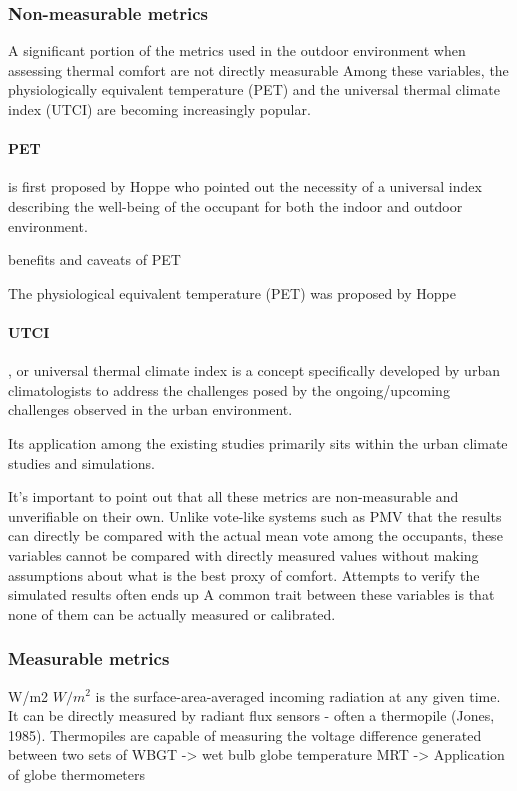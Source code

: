
\subsubsection{Non-measurable metrics}
    A significant portion of the metrics used in the outdoor environment when assessing thermal comfort are not directly measurable
    Among these variables, the physiologically equivalent temperature (PET) and the universal thermal climate index (UTCI) are becoming increasingly popular.
    \paragraph{PET} is first proposed by Hoppe who pointed out the necessity of a universal index describing the well-being of the occupant for both the indoor and outdoor environment. 
    
    benefits and caveats of PET
    

    The physiological equivalent temperature (PET) was proposed by Hoppe\cite{h._hoppe_new_1992}   
    \paragraph{UTCI}, or universal thermal climate index is a concept specifically developed by urban climatologists to address the challenges posed by the ongoing/upcoming challenges observed in the urban environment.
    
    Its application among the existing studies primarily sits within the urban climate studies and simulations.
    
    It's important to point out that all these metrics are non-measurable and unverifiable on their own. Unlike vote-like systems such as PMV that the results can directly be compared with the actual mean vote among the occupants, these variables cannot be compared with directly measured values without making assumptions about what is the best proxy of comfort. 
    Attempts to verify the simulated results often ends up  
    A common trait between these variables is that none of them can be actually measured or calibrated. 
\subsubsection{Measurable metrics}
        W/m2
        $W/m^2$ is the surface-area-averaged incoming radiation at any given time. It can be directly measured by radiant flux sensors - often a thermopile (Jones, 1985). Thermopiles are capable of measuring the voltage difference generated between two sets of 
        WBGT -> wet bulb globe temperature
        MRT -> Application of globe thermometers
